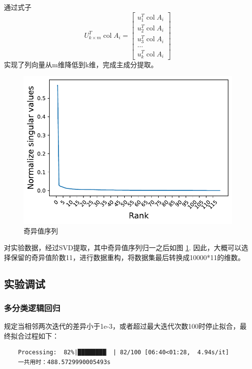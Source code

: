 \documentclass[UTF8,a4paper,AutoFakeBold,AutoFakeSlant]{article}
\begin{document}
通过式子
$$ U_{k \times m}^{T} \operatorname{col} A_{i}=\left[\begin{array}{c}
  u_{1}^{T} \operatorname{col} A_{i} \\
  u_{2}^{T} \operatorname{col} A_{i} \\
  u_{3}^{T} \operatorname{col} A_{i} \\
  \ldots \\
  u_{k}^{T} \operatorname{col} A_{i}
  \end{array}\right] $$
实现了列向量从m维降低到k维，完成主成分提取。

\begin{figure}[htbp]
	\centering
	\includegraphics[scale=0.625]{svd.pdf}
	\caption{奇异值序列}
	\label{f:奇异值序列}
\end{figure}

对实验数据，经过SVD提取，其中奇异值序列归一之后如图 \ref{f:奇异值序列}.
因此，大概可以选择保留的奇异值阶数11，进行数据重构，将数据集最后转换成10000*11的维数。



\subsection{实验调试}


\subsubsection{多分类逻辑回归}

规定当相邻两次迭代的差异小于1e-3，或者超过最大迭代次数100时停止拟合，最终拟合过程如下：

\begin{mdframed}[hidealllines=true,backgroundcolor=shadecolor]
  \begin{verbatim}
    Processing:  82%|████████▏ | 82/100 [06:40<01:28,  4.94s/it]
    一共用时：488.5729990005493s
  \end{verbatim}
\end{mdframed}
\end{document}
